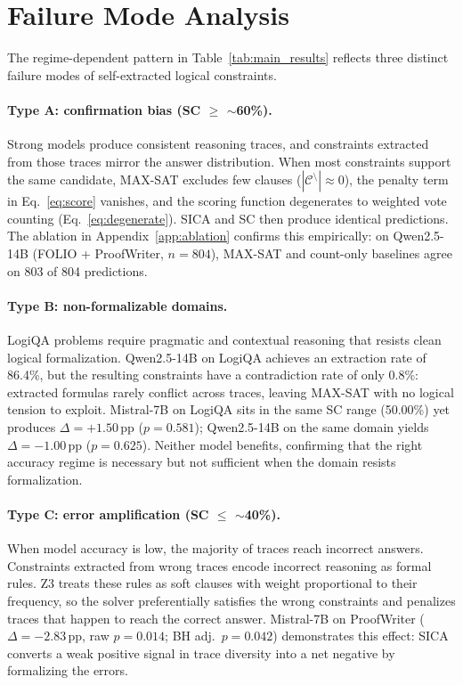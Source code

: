 \section{Failure Mode Analysis}
\label{app:failure-modes}
\label{sec:failure-modes}

The regime-dependent pattern in Table~\ref{tab:main_results} reflects three distinct failure modes of self-extracted logical constraints.

\paragraph{Type A: confirmation bias (SC $\geq$ $\sim$60\%).} Strong models produce consistent reasoning traces, and constraints extracted from those traces mirror the answer distribution. When most constraints support the same candidate, MAX-SAT excludes few clauses ($|\mathcal{C}^{\setminus}| \approx 0$), the penalty term in Eq.~\ref{eq:score} vanishes, and the scoring function degenerates to weighted vote counting (Eq.~\ref{eq:degenerate}). SICA and SC then produce identical predictions. The ablation in Appendix~\ref{app:ablation} confirms this empirically: on Qwen2.5-14B (FOLIO + ProofWriter, $n = 804$), MAX-SAT and count-only baselines agree on 803 of 804 predictions.

\paragraph{Type B: non-formalizable domains.} LogiQA problems require pragmatic and contextual reasoning that resists clean logical formalization. Qwen2.5-14B on LogiQA achieves an extraction rate of 86.4\%, but the resulting constraints have a contradiction rate of only 0.8\%: extracted formulas rarely conflict across traces, leaving MAX-SAT with no logical tension to exploit. Mistral-7B on LogiQA sits in the same SC range (50.00\%) yet produces $\Delta = +1.50$\,pp ($p = 0.581$); Qwen2.5-14B on the same domain yields $\Delta = -1.00$\,pp ($p = 0.625$). Neither model benefits, confirming that the right accuracy regime is necessary but not sufficient when the domain resists formalization.

\paragraph{Type C: error amplification (SC $\leq$ $\sim$40\%).} When model accuracy is low, the majority of traces reach incorrect answers. Constraints extracted from wrong traces encode incorrect reasoning as formal rules. Z3 treats these rules as soft clauses with weight proportional to their frequency, so the solver preferentially satisfies the wrong constraints and penalizes traces that happen to reach the correct answer. Mistral-7B on ProofWriter ($\Delta = -2.83$\,pp, raw $p = 0.014$; BH adj.\ $p = 0.042$) demonstrates this effect: SICA converts a weak positive signal in trace diversity into a net negative by formalizing the errors.


